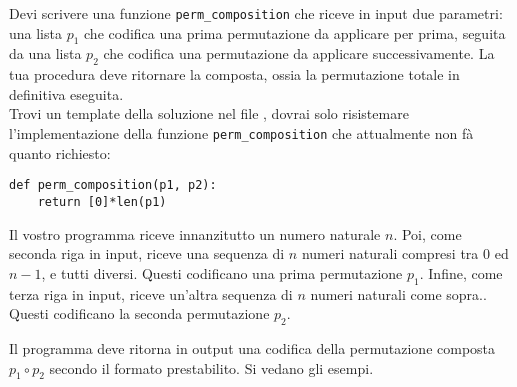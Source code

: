 \begin{minipage}[c]{.50\textwidth}

\end{minipage}

\medskip

Devi scrivere una funzione {\tt perm\_composition} che riceve in input due parametri: una lista $p_1$ che codifica una prima permutazione da applicare per prima, seguita da una lista $p_2$ che codifica una permutazione da applicare successivamente.
La tua procedura deve ritornare la composta, ossia la permutazione totale in definitiva eseguita. \\

Trovi un template della soluzione nel file \textbf{}, dovrai solo risistemare l'implementazione della funzione {\tt perm\_composition} che attualmente non fà quanto richiesto: 

\begin{verbatim}
def perm_composition(p1, p2):
    return [0]*len(p1)
\end{verbatim}


Il vostro programma riceve innanzitutto un numero naturale $n$. Poi,
come seconda riga in input, riceve una sequenza di $n$ numeri naturali compresi tra $0$ ed $n-1$, e tutti diversi. Questi codificano una prima permutazione $p_1$.
Infine,
come terza riga in input, riceve un'altra sequenza di $n$ numeri naturali come sopra.. Questi codificano la seconda permutazione $p_2$.


Il programma deve ritorna in output una codifica della permutazione composta $p_1\circ p_2$ secondo il formato prestabilito. Si vedano gli esempi.



